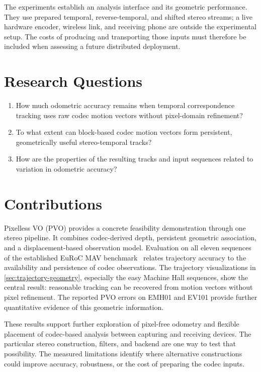 The experiments establish an analysis interface and its geometric performance.
They use prepared temporal, reverse-temporal, and shifted stereo streams;
a live hardware encoder, wireless link, and receiving phone are outside the
experimental setup. The costs of producing and transporting those inputs must
therefore be included when assessing a future distributed deployment.

\section{Research Questions}

\begin{enumerate}
  \item How much odometric accuracy remains when temporal correspondence tracking uses raw codec motion vectors without pixel-domain refinement?
  \item To what extent can block-based codec motion vectors form persistent,
        geometrically useful stereo-temporal tracks?
  \item How are the properties of the resulting tracks and input sequences related to variation in odometric accuracy?
\end{enumerate}

\section{Contributions}

Pixelless VO (PVO) provides a concrete feasibility demonstration through one
stereo pipeline. It combines codec-derived depth, persistent geometric
association, and a displacement-based observation model. Evaluation on all
eleven sequences of the established EuRoC MAV
benchmark~\cite{burri2016euroc} relates trajectory accuracy to the availability and
persistence of codec observations. The trajectory visualizations in
\autoref{sec:trajectory-geometry}, especially the easy Machine Hall sequences,
show the central result: reasonable tracking can be recovered from motion
vectors without pixel refinement. The reported PVO errors on EMH01 and EV101
provide further quantitative evidence of this geometric information.

These results support further exploration of pixel-free odometry and flexible
placement of codec-based analysis between capturing and receiving devices.
The particular stereo construction, filters, and backend are one way to test
that possibility. The measured limitations identify where alternative
constructions could improve accuracy, robustness, or the cost of preparing the
codec inputs.

